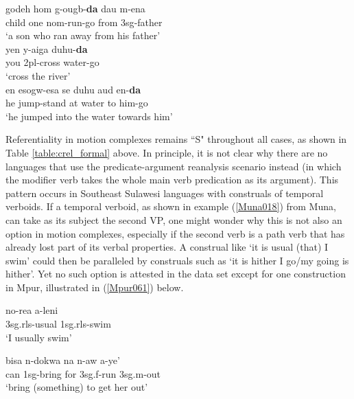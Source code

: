 \pex \label{Sougb002}
\a \label{Sougb002a}
\gll godeh hom g-ougb-\textbf{da} dau m-ena \\
child one \acs{nom}-run-go from \acs{3}\acs{sg}-father \\
\glft `a son who ran away from his father' \\ 
\z
\a
\gll yen y-aiga duhu-\textbf{da} \\ 
you \acs{2}\acs{pl}-cross water-go \\
\glft `cross the river' \\ 
\z
\a
\gll en esogw-esa se duhu aud en-\textbf{da} \\ 
he jump-stand at water to him-go \\
\glft `he jumped into the water towards him' \\ 
\z
\xe

Referentiality in motion complexes remains ``S" throughout all cases, as shown in Table \ref{table:crel_formal} above. In principle, it is not clear why there are no languages that use the predicate-argument reanalysis scenario instead (in which the modifier verb takes the whole main verb predication as its argument). This pattern occurs in Southeast Sulawesi languages with construals of temporal verboids. If a temporal verboid, as shown in example (\ref{Muna018}) from Muna, can take as its subject the second VP, one might wonder why this is not also an option in motion complexes, especially if the second verb is a path verb that has already lost part of its verbal properties. A construal like `it is usual (that) I swim' could then be paralleled by construals such as `it is hither I go/my going is hither'. Yet no such option is attested in the data set except for one construction in Mpur, illustrated in (\ref{Mpur061}) below.

\ea \label{Muna018}
\gll no-rea a-leni \\
\acs{3}\acs{sg}.\acs{rls}-usual \acs{1}\acs{sg}.\acs{rls}-swim \\
\glft `I usually swim' \\ 
\z
\xe

\ea \label{Mpur061}
\gll bisa n-dokwa na n-aw a-ye' \\
can \acs{1}\acs{sg}-bring for \acs{3}\acs{sg}.\acs{f}-run \acs{3}\acs{sg}.\acs{m}-out \\
\glft `bring (something) to get her out' \\ 
\z
\xe

